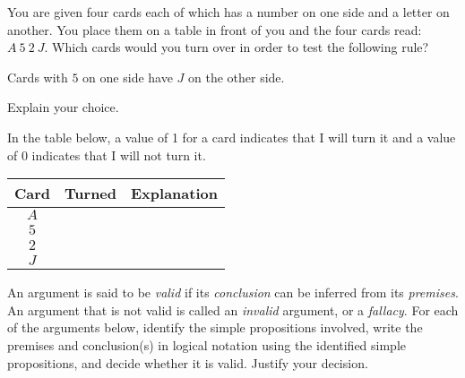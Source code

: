 \documentclass[addpoints]{exam}
\begin{document}
\begin{questions}


\question[5] You are given four cards each of which has a number on one side and a letter on another. You place them on a table in front of you and the four cards read: $A\ 5\ 2\ J$. Which cards would you turn over in order to test the following rule? 
  \begin{center}
    Cards with $5$ on one side have $J$ on the other side.
  \end{center}
  Explain your choice.
  \begin{solution} %
    In the table below, a value of 1 for a card indicates that I will turn it and a value of 0 indicates that I will not turn it.

    \begin{tabularx}{\textwidth}{c|c|X}
      Card & Turned & Explanation \\\hline
      $A$ &  \\
      $5$ &  \\
      $2$ &  \\
      $J$ &  
    \end{tabularx}
  \end{solution}
  
\question An argument is said to be \textit{valid} if its \textit{conclusion} can be inferred from its \textit{premises}. An argument that is not valid is called an \textit{invalid} argument, or a \textit{fallacy}. For each of the arguments below, identify the simple propositions involved, write the premises and conclusion(s) in logical notation using the identified simple propositions, and decide whether it is valid. Justify your decision.
  \begin{parts}

\end{parts}
\end{questions}
\end{document}
